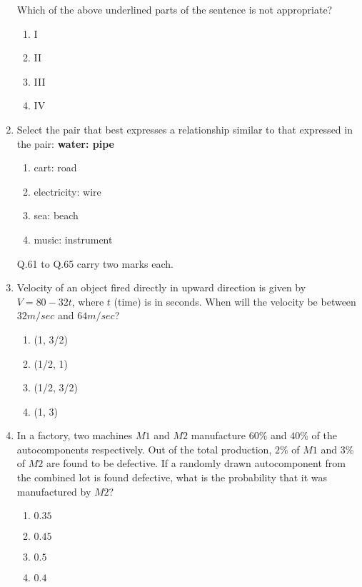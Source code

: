 \documentclass[journal]{IEEEtran}
\newcommand{\questionref}[1]{{ #1}}
\begin{document}
\begin{enumerate}
Which of the above underlined parts of the sentence is not appropriate?

\begin{enumerate}
    \item I
    \item II
    \item III
    \item IV\\
\end{enumerate}

\item \label{Q.60} Select the pair that best expresses a relationship similar to that expressed in the pair: \textbf{water: pipe}

\begin{enumerate}
    \item cart: road
    \item electricity: wire
    \item sea: beach
    \item music: instrument\\
\end{enumerate}

\questionref{Q.61} to \questionref{Q.65} carry two marks each.\\

\item \label{Q.61} Velocity of an object fired directly in upward direction is given by $V = 80 - 32t$, where $t$ (time) is in seconds. When will the velocity be between $32 m/sec$ and $64 m/sec$?

\begin{enumerate}
    \item (1, 3/2)
    \item (1/2, 1)
    \item (1/2, 3/2)
    \item (1, 3)\\
\end{enumerate}

\item \label{Q.62} In a factory, two machines $M1$ and $M2$ manufacture $60\%$ and $40\%$ of the autocomponents respectively. Out of the total production, $2\%$ of $M1$ and $3\%$ of $M2$ are found to be defective. If a randomly drawn autocomponent from the combined lot is found defective, what is the probability that it was manufactured by $M2$?

\begin{enumerate}
    \item $0.35$
    \item $0.45$
    \item $0.5$
    \item $0.4$\\
\end{enumerate}


\end{enumerate}
\end{document}
